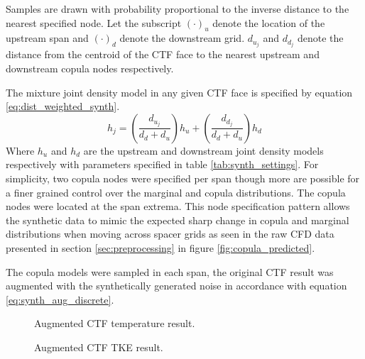 Samples are drawn with probability proportional to the inverse distance to the nearest specified node.
Let the subscript $(\cdot)_u$ denote the location of the upstream span and $(\cdot)_d$ denote the downstream grid. $d_{u_j}$ and  $d_{d_j}$ denote the distance from the centroid of the CTF face to the nearest upstream and downstream copula nodes respectively.

The mixture joint density model in any given CTF face is specified by equation \ref{eq:dist_weighted_synth}.
\begin{equation}
    h_j = \left( \frac{d_{u_j}}{d_{d} + d_{u}} \right) h_u +
    \left( \frac{d_{d_j}}{d_{d} + d_{u}} \right) h_d
    \label{eq:dist_weighted_synth}
\end{equation}
Where $h_u$ and $h_d$ are the upstream and downstream joint density models respectively with parameters specified in table \ref{tab:synth_settings}.
For simplicity, two copula nodes were specified per span though more are possible for a finer grained control over the marginal and copula distributions.    The copula nodes were located at the span extrema. This node specification pattern allows the synthetic data to mimic the expected sharp change in copula and marginal distributions when moving across spacer grids as seen in the raw CFD data presented in section \ref{sec:preprocessing} in figure \ref{fig:copula_predicted}.

The copula models were sampled in each span, the original CTF result was augmented with the synthetically generated noise in accordance with equation \ref{eq:synth_aug_discrete}.

\begin{figure}[H]%
    \centering
    \hspace*{-1.0em}%
    \caption[Augmented CFD result.]{Augmented CTF temperature result.}%
    \label{fig:ctf_twall_aug}%
\end{figure}

\begin{figure}[H]%
    \centering
    \hspace*{-1.0em}%
    \caption[Augmented CFD TKE result.]{Augmented CTF TKE result.}%
    \label{fig:ctf_tke_aug}%
\end{figure}

